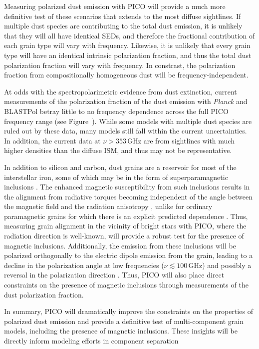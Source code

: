 \documentclass[PICOReport.tex]{subfiles}
\begin{document}
Measuring polarized dust emission with PICO will provide a much more definitive test of these scenarios that extends to the most diffuse sightlines. If multiple dust species are contributing to the total dust emission, it is unlikely that they will all have identical SEDs, and therefore the fractional contribution of each grain type will vary with frequency. Likewise, it is unlikely that every grain type will have an identical intrinsic polarization fraction, and thus the total dust polarization fraction will vary with frequency. In constrast, the polarization fraction from compositionally homogeneous dust will be frequency-independent.

At odds with the spectropolarimetric evidence from dust extinction, current measurements of the polarization fraction of the dust emission with {\it Planck} \citep{Planck_Int_XXII} and BLASTPol \citep{Ashton2018} betray little to no frequency dependence across the full PICO frequency range (see Figure~). While some models with multiple dust species are ruled out by these data, many models still fall within the current uncertainties. In addition, the current data at $\nu > 353\,$GHz are from sightlines with much higher densities than the diffuse ISM, and thus may not be representative. 

In addition to silicon and carbon, dust grains are a reservoir for most of the interstellar iron, some of which may be in the form of superparamagnetic inclusions \citep{Draine2013}. The enhanced magnetic susceptibility from such inclusions results in the alignment from radiative torques becoming independent of the angle between the magnetic field and the radiation anisotropy \citep{Lazarian2007b,Hoang2015}, unlike for ordinary paramagnetic grains for which there is an explicit predicted dependence \citep{Lazarian2007a}. Thus, measuring grain alignment in the vicinity of bright stars with PICO, where the radiation direction is well-known, will provide a robust test for the presence of magnetic inclusions. Additionally, the emission from these inclusions will be polarized orthogonally to the electric dipole emission from the grain, leading to a decline in the polarization angle at low frequencies ($\nu \lesssim 100$\,GHz) and possibly a reversal in the polarization direction \citep{Draine2013}. Thus, PICO will also place direct constraints on the presence of magnetic inclusions through measurements of the dust polarization fraction.

In summary, PICO will dramatically improve the constraints on the properties of polarized dust emission and provide a definitive test of multi-component grain models, including the presence of magnetic inclusions. These insights will be directly inform modeling efforts in component separation
\end{document}
